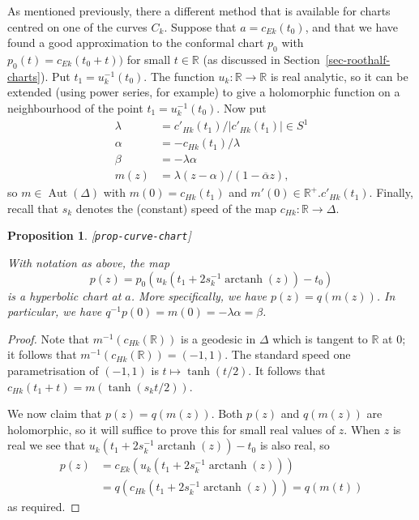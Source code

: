\documentclass[reqno]{amsart}
\newcommand{\lbl}[1]{\label{#1}\textup{[\texttt{#1}]}\par}
\newcommand{\lbl}{\label}
\newcommand{\Aut}	{\operatorname{Aut}}
\newcommand{\arctanh}	{\operatorname{arctanh}}
\newcommand{\Dl}        {\Delta}
\newcommand{\al}        {\alpha}
\newcommand{\bt}        {\beta}
\newcommand{\lm}        {\lambda}
\newcommand{\R}         {{\mathbb{R}}}
\newcommand{\ov}[1]     {\overline{#1}}
\renewcommand{\:}{\colon}
\newtheorem{proposition}[theorem]{Proposition}
\theoremstyle{definition}
\begin{document}
As mentioned previously, there a different method that is available
for charts centred on one of the curves $C_k$.  Suppose that
$a=c_{Ek}(t_0)$, and that we have found a good approximation to the
conformal chart $p_0$ with $p_0(t)=c_{Ek}(t_0+t))$ for small $t\in\R$
(as discussed in Section~\ref{sec-roothalf-charts}).  Put
$t_1=u_k^{-1}(t_0)$.  The function $u_k\:\R\to\R$ is real analytic, so
it can be extended (using power series, for example) to give a
holomorphic function on a neighbourhood of the point
$t_1=u_k^{-1}(t_0)$.  Now put
\begin{align*}
 \lm &= c'_{Hk}(t_1)/|c'_{Hk}(t_1)|\in S^1 \\
 \al &= -c_{Hk}(t_1)/\lm \\
 \bt &= -\lm\al \\
 m(z) &= \lm(z-\al)/(1-\ov{\al}z),
\end{align*}
so $m\in\Aut(\Dl)$ with $m(0)=c_{Hk}(t_1)$ and
$m'(0)\in\R^+.c'_{Hk}(t_1)$.  Finally, recall that $s_k$ denotes the
(constant) speed of the map $c_{Hk}\:\R\to\Dl$.

\begin{proposition}\lbl{prop-curve-chart}
 With notation as above, the map
 \[ p(z) = p_0(u_k(t_1+2s_k^{-1}\arctanh(z))-t_0) \]
 is a hyperbolic chart at $a$.  More specifically, we have
 $p(z)=q(m(z))$.  In particular, we have $q^{-1}p(0)=m(0)=-\lm\al=\bt$.
\end{proposition}
\begin{proof}
 Note that $m^{-1}(c_{Hk}(\R))$ is a geodesic in $\Dl$ which is
 tangent to $\R$ at $0$; it follows that
 $m^{-1}(c_{Hk}(\R))=(-1,1)$.  The standard speed one parametrisation
 of $(-1,1)$ is $t\mapsto\tanh(t/2)$.  It follows that
 $c_{Hk}(t_1+t)=m(\tanh(s_kt/2))$.

 We now claim that $p(z)=q(m(z))$.  Both $p(z)$ and $q(m(z))$ are
 holomorphic, so it will suffice to prove this for small real values
 of $z$.  When $z$ is real we see that
 $u_k(t_1+2s_k^{-1}\arctanh(z))-t_0$ is also real, so
 \begin{align*}
  p(z) &= c_{Ek}(u_k(t_1+2s_k^{-1}\arctanh(z))) \\
       &= q(c_{Hk}(t_1+2s_k^{-1}\arctanh(z))) = q(m(t))
 \end{align*}
 as required.
\end{proof}
\end{document}
